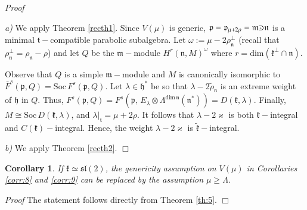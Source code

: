 \documentclass[default]{./styles/svmult}
\newtheorem{cor}[theo]{Corollary}
\renewenvironment{proof}{ \emph{Proof}}{$\Box$}
\newcommand{\Soc}{\mathrm{Soc}}
\newcommand{\hh}{\mathfrak{h}}
\newcommand{\kk}{\mathfrak{k}}
\newcommand{\mm}{\mathfrak{m}}
\newcommand{\nn}{\mathfrak{n}}
\newcommand{\pp}{\mathfrak{p}}
\renewcommand{\tt}{\mathfrak{t}}
\renewcommand{\sl}{\mathfrak{sl}}
\newcommand{\refth}[1]{Theorem \ref{#1}}
\def\crplus{\hbox{$\supset${\raise1.05pt\hbox{\kern -0.55em ${\scriptscriptstyle +}$}}\ }}
\begin{document}
\begin{proof}

 \textit{a)} We apply Theorem \ref{recth1}. Since $V(\mu)$ is generic, $\pp=\pp_{\mu+2\rho} = \mm \crplus \nn$ is a minimal $\tt-$compatible parabolic subalgebra. Let $\omega :=\mu - 2\rho_{\nn}^{\perp}$ (recall that $\rho_{\nn}^{\perp} = \rho_{\nn} - \rho $) and let $Q$ be the $\mm-$module $H^r(\nn,M)^{\omega}$ where $r=\mathrm{dim}(\kk^{\perp} \cap \nn)$.

Observe that $Q$ is a simple $\mm-$module and $M$ is canonically isomorphic to $\bar{F}^s(\pp,Q) = \Soc\,F^s(\pp,Q)$. Let $\lambda \in \hh^*$ be so that $\lambda - 2\tilde{\rho}_{\nn}$ is an extreme weight of $\hh$ in $Q$. Thus, $F^s(\pp,Q) = F^s(\pp,\,E_{\lambda} \otimes \Lambda ^{\mathrm{dim}\,\nn}(\nn^*)) = D(\kk,\lambda)$. Finally, $M \cong \Soc\,D(\kk,\lambda)$, and $\lambda|_{\tt} = \mu + 2\rho$. It follows that $\lambda - 2\varkappa$ is both $\kk-$integral and $C(\kk)-$integral. Hence, the weight $\lambda - 2\varkappa$ is $\tilde{\kk}-$integral.

\vspace{0.3cm}

 \textit{b)} We apply Theorem \ref{recth2}.
\end{proof}

% 

\begin{cor}\label{corr:7}
    If $\kk\simeq \sl(2)$, the genericity assumption on $V(\mu)$ in Corollaries \ref{corr:8} and \ref{corr:9} can be replaced by the assumption $\mu\geq\Lambda$.
\end{cor}

\begin{proof}
The statement follows directly from Theorem \ref{th:5}.
\end{proof}

\vspace{0.3cm}
\end{document}
